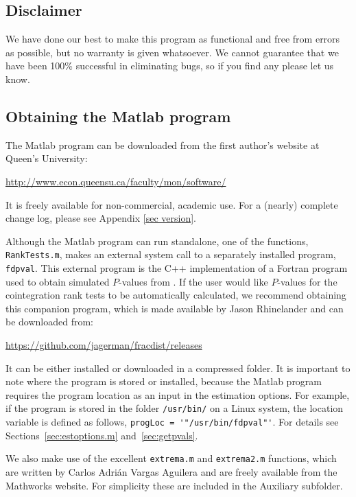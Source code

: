 \documentclass[10pt]{article}
\begin{document}
\subsection{Disclaimer}

We have done our best to make this program as functional and free from errors as possible, but no warranty is given whatsoever. We cannot guarantee that we have been 100\% successful in eliminating bugs, so if you find any please let us know. 


\subsection{Obtaining the Matlab program}

The Matlab program can be downloaded from the first author's website at Queen's University:

\begin{center} \url{http://www.econ.queensu.ca/faculty/mon/software/}
\end{center}

\noindent It is freely available for non-commercial, academic use. For a (nearly) complete change log, please see Appendix \ref{sec version}.

Although the Matlab program can run standalone, one of the functions, \verb|RankTests.m|, makes an external system call to a separately installed program, \verb|fdpval|. This external program is the C++ implementation of a Fortran program used to obtain simulated $P$-values from \cite{mackinnon2014numerical}. If the user would like $P$-values for the cointegration rank tests to be automatically calculated, we recommend obtaining this companion program, which is made available by Jason Rhinelander and can be downloaded from: 
\begin{center} \url{https://github.com/jagerman/fracdist/releases}
\end{center}
It can be either installed or downloaded in a compressed folder. It is important to note where the program is stored or installed, because the Matlab program requires the program location as an input in the estimation options. For example, if the program is stored in the folder \verb|/usr/bin/| on a Linux system, the location variable is defined as follows, \verb|progLoc = '"/usr/bin/fdpval"'|. For details see Sections~\ref{sec:estoptions.m} and~\ref{sec:getpvals}.

We also make use of the excellent \verb|extrema.m| and \verb|extrema2.m| functions, which are written by Carlos Adrián Vargas Aguilera and are freely available from the Mathworks website. For simplicity these are included in the Auxiliary subfolder.
\end{document}
